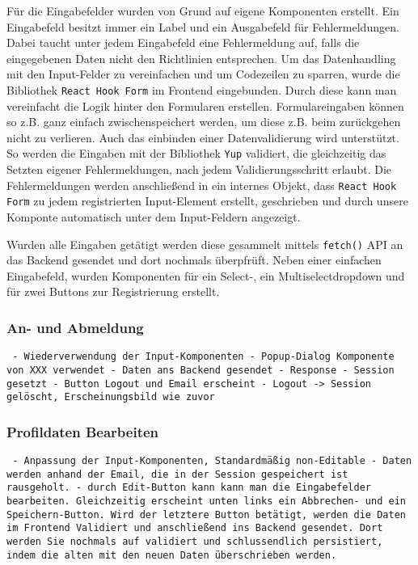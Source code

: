 \documentclass[conference,a4paper,flushend]{cs-techrep}
\begin{document}
Für die Eingabefelder wurden von Grund auf eigene Komponenten erstellt. Ein Eingabefeld besitzt immer ein Label und ein Ausgabefeld für Fehlermeldungen. Dabei taucht unter jedem Eingabefeld eine Fehlermeldung auf, falls die eingegebenen Daten nicht den Richtlinien entsprechen. 
Um das Datenhandling mit den Input-Felder zu vereinfachen und um Codezeilen zu sparren, wurde die Bibliothek \texttt{React Hook Form} im Frontend eingebunden. Durch diese kann man vereinfacht die Logik hinter den Formularen erstellen. %
Formulareingaben können so z.B. ganz einfach zwischenspeichert werden, um diese z.B. beim zurückgehen nicht zu verlieren. Auch das einbinden einer Datenvalidierung wird unterstützt. So werden die Eingaben mit der Bibliothek \texttt{Yup} validiert, die gleichzeitig das Setzten eigener Fehlermeldungen, nach jedem Validierungsschritt erlaubt. Die Fehlermeldungen werden anschließend in ein internes Objekt, dass \texttt{React Hook Form} zu jedem registrierten Input-Element erstellt, geschrieben und durch unsere Komponte automatisch unter dem Input-Feldern angezeigt. 

Wurden alle Eingaben getätigt werden diese gesammelt mittels \texttt{fetch()} API an das Backend gesendet und dort nochmals überpfrüft.
Neben einer einfachen Eingabefeld, wurden Komponenten für ein Select-, ein Multiselectdropdown und für zwei Buttons zur Registrierung erstellt. 



\subsubsection{An- und Abmeldung\\}
\texttt{
- Wiederverwendung der Input-Komponenten
- Popup-Dialog Komponente von XXX verwendet
- Daten ans Backend gesendet - Response - Session gesetzt 
- Button Logout und Email erscheint 
- Logout -> Session gelöscht, Erscheinungsbild wie zuvor
}
\subsubsection{Profildaten Bearbeiten\\}
\texttt{
- Anpassung der Input-Komponenten, Standardmäßig non-Editable
- Daten werden anhand der Email, die in der Session gespeichert ist rausgeholt.
- durch Edit-Button kann kann man die Eingabefelder bearbeiten. Gleichzeitig erscheint unten links ein Abbrechen- und ein Speichern-Button. Wird der letztere Button betätigt, werden die Daten im Frontend Validiert und anschließend ins Backend gesendet. Dort werden Sie nochmals auf validiert und schlussendlich persistiert, indem die alten mit den neuen Daten überschrieben werden.
}
\end{document}
